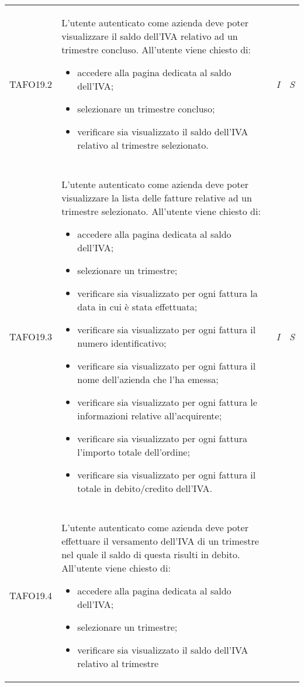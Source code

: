 \begin{longtable}{ >{\centering}p{} >{}p{}
			>{\centering}p{} >{\centering}p{}}
\hypertarget{TAFO19.2}{TAFO19.2} & L'utente autenticato come azienda deve poter visualizzare il saldo dell'IVA
		 relativo ad un trimestre concluso. All'utente viene chiesto di:
		 \begin{itemize}
		 	\item accedere alla pagina dedicata al saldo dell'IVA;
		 	\item selezionare un trimestre concluso;
		 	\item verificare sia visualizzato il saldo dell'IVA relativo al trimestre
		 	selezionato.
		 \end{itemize} & \textit{I} & \textit{S}\\ \tabularnewline
\hypertarget{TAFO19.3}{TAFO19.3} & L'utente autenticato come azienda deve poter visualizzare la lista delle
		 fatture relative ad un trimestre selezionato. All'utente viene chiesto di:
		 \begin{itemize}
		 	\item accedere alla pagina dedicata al saldo dell'IVA;
		 	\item selezionare un trimestre;
		 	\item verificare sia visualizzato per ogni fattura la data in cui è stata
		 	effettuata;
		 	\item verificare sia visualizzato per ogni fattura il numero identificativo;
		 	\item verificare sia visualizzato per ogni fattura il nome dell'azienda che
		 	l'ha emessa;
		 	\item verificare sia visualizzato per ogni fattura le informazioni relative
		 	all'acquirente;
		 	\item verificare sia visualizzato per ogni fattura l'importo totale
		 	dell'ordine;
		 	\item verificare sia visualizzato per ogni fattura il totale in debito/credito
		 	dell'IVA.
		 \end{itemize} & \textit{I} & \textit{S}\\ \tabularnewline
\hypertarget{TAFO19.4}{TAFO19.4} & L'utente autenticato come azienda deve poter effettuare il versamento 
		 dell'IVA di un trimestre nel quale il saldo di questa risulti in debito. All'utente 
		 viene chiesto di:
		 \begin{itemize}
		 	\item accedere alla pagina dedicata al saldo dell'IVA;
		 	\item selezionare un trimestre;
		 	\item verificare sia visualizzato il saldo dell'IVA relativo al trimestre

\end{itemize}
\end{longtable}
